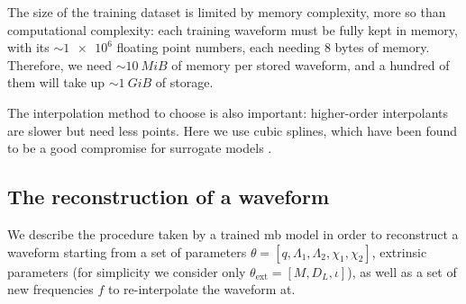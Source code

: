 \documentclass[main.tex]{subfiles}
\begin{document}
The size of the training dataset is limited by memory complexity, more so than computational complexity: each training waveform must be fully kept in memory, with its \(\sim \num{1e6}\) floating point numbers, each needing 8 bytes of memory. 
Therefore, we need \(\sim \SI{10}{MiB}\) of memory per stored waveform, and a hundred of them will take up \( \sim \SI{1}{GiB}\) of storage. 

The interpolation method to choose is also important: higher-order interpolants are slower but need less points.
Here we use cubic splines, which have been found to be a good compromise for surrogate models \cite{lackeySurrogateModelAlignedspin2019}.

\subsection{The reconstruction of a waveform}

We describe the procedure taken by a trained \ac{mb} model in order to reconstruct a waveform starting from a set of parameters \(\theta = [q, \Lambda_1 , \Lambda_2 , \chi_1 , \chi_2 ]\), extrinsic parameters (for simplicity we consider only \(\theta _{\text{ext}} = [M, D_L, \iota]\)), as well as a set of new frequencies \(f\) to re-interpolate the waveform at.
\end{document}
